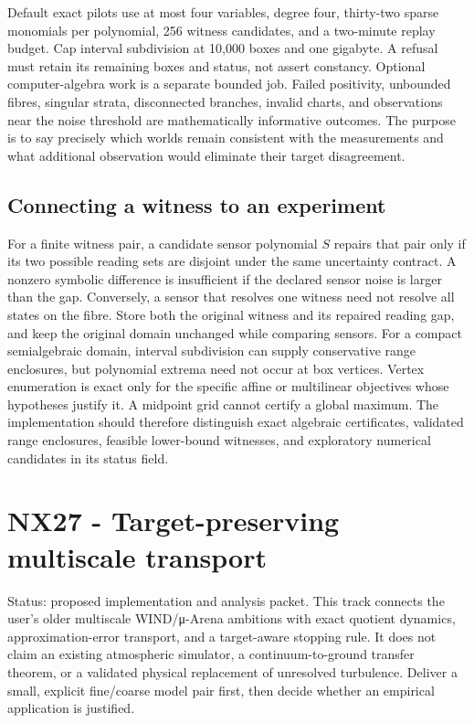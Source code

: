 \documentclass[
  11pt,
  a4paper,
]{report}
\begin{document}
Default exact pilots use at most four variables, degree four, thirty-two
sparse monomials per polynomial, 256 witness candidates, and a
two-minute replay budget. Cap interval subdivision at 10,000 boxes and
one gigabyte. A refusal must retain its remaining boxes and status, not
assert constancy. Optional computer-algebra work is a separate bounded
job. Failed positivity, unbounded fibres, singular strata, disconnected
branches, invalid charts, and observations near the noise threshold are
mathematically informative outcomes. The purpose is to say precisely
which worlds remain consistent with the measurements and what additional
observation would eliminate their target disagreement.

\hypertarget{connecting-a-witness-to-an-experiment}{%
\section{Connecting a witness to an
experiment}\label{connecting-a-witness-to-an-experiment}}

For a finite witness pair, a candidate sensor polynomial \(S\) repairs
that pair only if its two possible reading sets are disjoint under the
same uncertainty contract. A nonzero symbolic difference is insufficient
if the declared sensor noise is larger than the gap. Conversely, a
sensor that resolves one witness need not resolve all states on the
fibre. Store both the original witness and its repaired reading gap, and
keep the original domain unchanged while comparing sensors. For a
compact semialgebraic domain, interval subdivision can supply
conservative range enclosures, but polynomial extrema need not occur at
box vertices. Vertex enumeration is exact only for the specific affine
or multilinear objectives whose hypotheses justify it. A midpoint grid
cannot certify a global maximum. The implementation should therefore
distinguish exact algebraic certificates, validated range enclosures,
feasible lower-bound witnesses, and exploratory numerical candidates in
its status field.

\hypertarget{nx27---target-preserving-multiscale-transport}{%
\chapter{NX27 - Target-preserving multiscale
transport}\label{nx27---target-preserving-multiscale-transport}}

Status: proposed implementation and analysis packet. This track connects
the user's older multiscale WIND/μ-Arena ambitions with exact quotient
dynamics, approximation-error transport, and a target-aware stopping
rule. It does not claim an existing atmospheric simulator, a
continuum-to-ground transfer theorem, or a validated physical
replacement of unresolved turbulence. Deliver a small, explicit
fine/coarse model pair first, then decide whether an empirical
application is justified.
\end{document}
